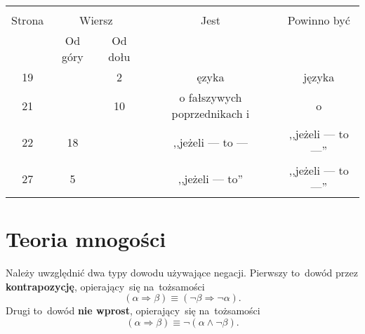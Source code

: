 \documentclass[a4paper,11pt]{article}
\begin{document}



\begin{center}

  \begin{tabular}{|c|c|c|c|c|}
    \hline
    & \multicolumn{2}{c|}{} & & \\
    Strona & \multicolumn{2}{c|}{Wiersz} & Jest
                              & Powinno być \\ \cline{2-3}
    & Od góry & Od dołu & & \\
    \hline
    19  & &  2 & ęzyka & języka \\
    21  & & 10 & o fałszywych poprzednikach i & o \\
    22  & 18 & & ,,jeżeli --- to ---  %
           & ,,jeżeli --- to ---'' \\
    27  &  5 & & ,,jeżeli --- to'' & ,,jeżeli --- to ---'' \\
    \hline
  \end{tabular}

\end{center}

\vspace{\spaceTwo}










\newpage
\section{Teoria mnogości}

\vspace{\spaceTwo}






\start {} Należy uwzględnić dwa typy dowodu używające negacji.
Pierwszy to~dowód przez \textbf{kontrapozycję}, opierający~się
na~tożsamości
\begin{equation}
  \label{eq:Kuratowski-01}
  ( \alpha \Rightarrow \beta ) \equiv ( \neg \beta \Rightarrow \neg \alpha).
\end{equation}
Drugi to~dowód \textbf{nie wprost}, opierający~się na~tożsamości
\begin{equation}
  \label{eq:Kuratowski-02}
  ( \alpha \Rightarrow \beta ) \equiv \neg ( \alpha \land \neg \beta ).
\end{equation}
\end{document}
